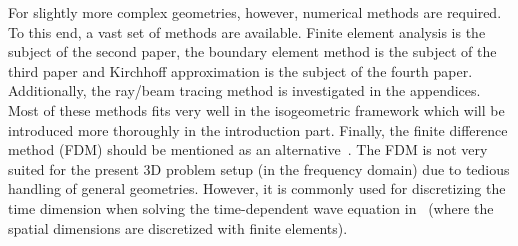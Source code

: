 For slightly more complex geometries, however, numerical methods are required. To this end, a vast set of methods are available. Finite element analysis is the subject of the second paper, the boundary element method is the subject of the third paper and Kirchhoff approximation is the subject of the fourth paper. Additionally, the ray/beam tracing method is investigated in the appendices. Most of these methods fits very well in the isogeometric framework which will be introduced more thoroughly in the introduction part. Finally, the finite difference method (FDM) should be mentioned as an alternative~\cite{Wang1996fdt}. The FDM is not very suited for the present 3D problem setup (in the frequency domain) due to tedious handling of general geometries. However, it is commonly used for discretizing the time dimension when solving the time-dependent wave equation in~ (where the spatial dimensions are discretized with finite elements).

